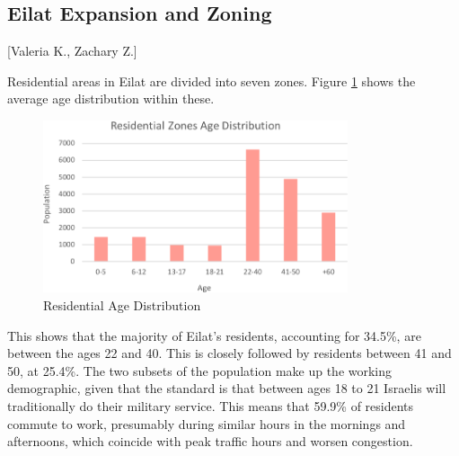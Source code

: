 \documentclass[12pt]{article}                               %
\begin{document}
\subsection{Eilat Expansion and Zoning}[Valeria K., Zachary Z.]


Residential areas in Eilat are divided into seven zones. Figure \ref{img:Residential_Age_Distribution} shows the average age distribution within these. 

\begin{figure}[H]
    \centering
    \includegraphics[width=0.8\textwidth]{images/resident_age_distribution.png}
    \caption{Residential Age Distribution}
    \label{img:Residential_Age_Distribution}
\end{figure}

This shows that the majority of Eilat's residents, accounting for 34.5\%, are between the ages 22 and 40. This is closely followed by residents between 41 and 50, at 25.4\%. The two subsets of the population make up the working demographic, given that the standard is that between ages 18 to 21 Israelis will traditionally do their military service. This means that 59.9\% of residents commute to work, presumably during similar hours in the mornings and afternoons, which coincide with peak traffic hours and worsen congestion.


\end{document}

